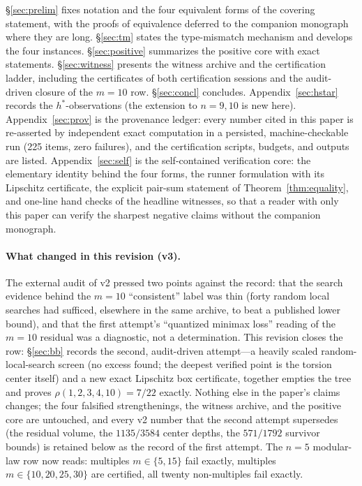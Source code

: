 \S\ref{sec:prelim} fixes notation and the four equivalent forms of the
covering statement, with the proofs of equivalence deferred to the
companion monograph where they are long. \S\ref{sec:tm} states the
type-mismatch mechanism and develops the four instances.
\S\ref{sec:positive} summarizes the positive core with exact statements.
\S\ref{sec:witness} presents the witness archive and the certification
ladder, including the certificates of both certification sessions and
the audit-driven closure of the $m=10$ row.
\S\ref{sec:concl} concludes. Appendix~\ref{sec:hstar} records the
$h^*$-observations (the extension to $n=9,10$ is new here).
Appendix~\ref{sec:prov} is the provenance ledger: every number cited in
this paper is re-asserted by independent exact computation in a
persisted, machine-checkable run (225 items, zero failures), and the
certification scripts, budgets, and outputs are listed.
Appendix~\ref{sec:self} is the self-contained verification core: the
elementary identity behind the four forms, the runner formulation with
its Lipschitz certificate, the explicit pair-sum statement of
Theorem~\ref{thm:equality}, and one-line hand checks of the headline
witnesses, so that a reader with only this paper can verify the sharpest
negative claims without the companion monograph.

\paragraph{What changed in this revision (v3).}
The external audit of v2 pressed two points against the record: that
the search evidence behind the $m=10$ ``consistent'' label was thin
(forty random local searches had sufficed, elsewhere in the same
archive, to beat a published lower bound), and that the first
attempt's ``quantized minimax loss'' reading of the $m=10$ residual
was a diagnostic, not a determination. This revision closes the row:
\S\ref{sec:bb} records the second, audit-driven attempt---a heavily
scaled random-local-search screen (no excess found; the deepest
verified point is the torsion center itself) and a new exact Lipschitz
box certificate, together empties the tree and proves
$\rho(1,2,3,4,10)=7/22$ exactly. Nothing else in the paper's claims
changes; the four falsified strengthenings, the witness archive, and
the positive core are untouched, and every v2 number that the second
attempt supersedes (the residual volume, the $1135/3584$ center
depths, the $571/1792$ survivor bounds) is retained below as the
record of the first attempt. The $n=5$ modular-law row now reads:
multiples $m\in\{5,15\}$ fail exactly, multiples
$m\in\{10,20,25,30\}$ are certified, all twenty non-multiples fail
exactly.

